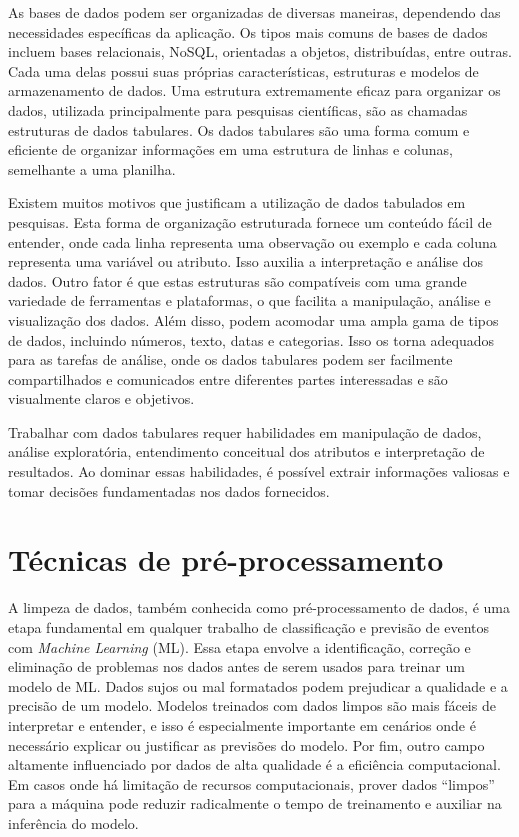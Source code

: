 As bases de dados podem ser organizadas de diversas maneiras, dependendo das necessidades específicas da aplicação. Os tipos mais comuns de bases de dados incluem bases relacionais, NoSQL, orientadas a objetos, distribuídas, entre outras. Cada uma delas possui suas próprias características, estruturas e modelos de armazenamento de dados. Uma estrutura extremamente eficaz para organizar os dados, utilizada principalmente para pesquisas científicas, são as chamadas estruturas de dados tabulares. Os dados tabulares são uma forma comum e eficiente de organizar informações em uma estrutura de linhas e colunas, semelhante a uma planilha.

Existem muitos motivos que justificam a utilização de dados tabulados em pesquisas. Esta forma de organização estruturada fornece um conteúdo fácil de entender, onde cada linha representa uma observação ou exemplo e cada coluna representa uma variável ou atributo. Isso auxilia a interpretação e análise dos dados. Outro fator é que estas estruturas são compatíveis com uma grande variedade de ferramentas e plataformas, o que facilita a manipulação, análise e visualização dos dados. Além disso, podem acomodar uma ampla gama de tipos de dados, incluindo números, texto, datas e categorias. Isso os torna adequados para as tarefas de análise, onde os dados tabulares podem ser facilmente compartilhados e comunicados entre diferentes partes interessadas e são visualmente claros e objetivos.

Trabalhar com dados tabulares requer habilidades em manipulação de dados, análise exploratória, entendimento conceitual dos atributos e interpretação de resultados. Ao dominar essas habilidades, é possível extrair informações valiosas e tomar decisões fundamentadas nos dados fornecidos.

\section{Técnicas de pré-processamento}

A limpeza de dados, também conhecida como pré-processamento de dados, é uma etapa fundamental em qualquer trabalho de classificação e previsão de eventos com \textit{Machine Learning} (ML). Essa etapa envolve a identificação, correção e eliminação de problemas nos dados antes de serem usados para treinar um modelo de ML. Dados sujos ou mal formatados podem prejudicar a qualidade e a precisão de um modelo. Modelos treinados com dados limpos são mais fáceis de interpretar e entender, e isso é especialmente importante em cenários onde é necessário explicar ou justificar as previsões do modelo. Por fim, outro campo altamente influenciado por dados de alta qualidade é a eficiência computacional. Em casos onde há limitação de recursos computacionais, prover dados ``limpos'' para a máquina pode reduzir radicalmente o tempo de treinamento e auxiliar na inferência do modelo.

